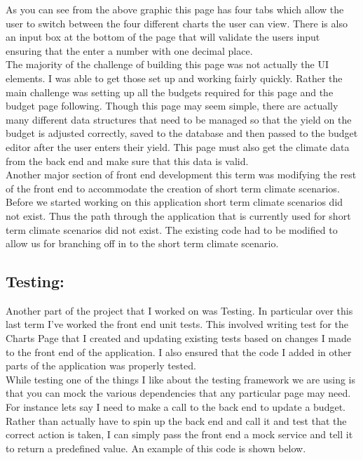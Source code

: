 \documentclass[onecolumn, draftclsnofoot,10pt, compsoc]{article}
\begin{document}
	As you can see from the above graphic this page has four tabs which allow the user to switch between the four different charts the user can view. There is also an input box at the bottom of the page that will validate the users input ensuring that the enter a number with one decimal place.\\
	
	The majority of the challenge of building this page was not actually the UI elements. I was able to get those set up and working fairly quickly. Rather the main challenge was setting up all the budgets required for this page and the budget page following. Though this page may seem simple, there are actually many different data structures that need to be managed so that the yield on the budget is adjusted correctly, saved to the database and then passed to the budget editor after the user enters their yield. This page must also get the climate data from the back end and make sure that this data is valid.\\
	
	Another major section of front end development this term was modifying the rest of the front end to accommodate the creation of short term climate scenarios. Before we started working on this application short term climate scenarios did not exist. Thus the path through the application that is currently used for short term climate scenarios did not exist. The existing code had to be modified to allow us for branching off in to the short term climate scenario.\\
	
		\subsection{Testing:}
		Another part of the project that I worked on was Testing. In particular over this last term I've worked the front end unit tests. This involved writing test for the Charts Page that I created and updating existing tests based on changes I made to the front end of the application. I also ensured that the code I added in other parts of the application was properly tested.\\
		
		While testing one of the things I like about the testing framework we are using is that you can mock the various dependencies that any particular page may need. For instance lets say I need to make a call to the back end to update a budget. Rather than actually have to spin up the back end and call it and test that the correct action is taken, I can simply pass the front end a mock service and tell it to return a predefined value. An example of this code is shown below.\\
		
\end{document}

